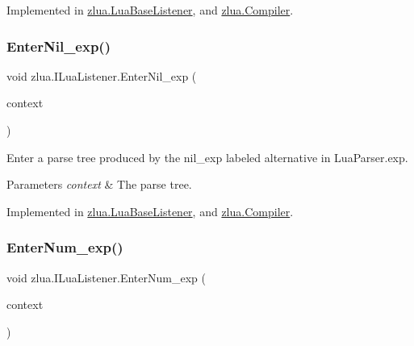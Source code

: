 Implemented in \mbox{\hyperlink{classzlua_1_1_lua_base_listener_a7e9f223eea630cb4d7deac2257225a75}{zlua.\+Lua\+Base\+Listener}}, and \mbox{\hyperlink{classzlua_1_1_compiler_a2a5054c21e462c7c373154ea435db694}{zlua.\+Compiler}}.

\mbox{\label{interfacezlua_1_1_i_lua_listener_aafcaca4386184948c08ead3b5dbba3be}} 
\subsubsection{\texorpdfstring{Enter\+Nil\+\_\+exp()}{EnterNil\_exp()}}
{\footnotesize\ttfamily void zlua.\+I\+Lua\+Listener.\+Enter\+Nil\+\_\+exp (\begin{DoxyParamCaption}\item[{\mbox{[}\+Not\+Null\mbox{]} \mbox{\hyperlink{classzlua_1_1_lua_parser_1_1_nil__exp_context}{Lua\+Parser.\+Nil\+\_\+exp\+Context}}}]{context }\end{DoxyParamCaption})}



Enter a parse tree produced by the {\ttfamily nil\+\_\+exp} labeled alternative in Lua\+Parser.\+exp. 


\begin{DoxyParams}{Parameters}
{\em context} & The parse tree.\\
\hline
\end{DoxyParams}


Implemented in \mbox{\hyperlink{classzlua_1_1_lua_base_listener_acf401fd123113e2bfdaf5c5390d81871}{zlua.\+Lua\+Base\+Listener}}, and \mbox{\hyperlink{classzlua_1_1_compiler_a311aa04e7e5d26fae07d698a436dab6d}{zlua.\+Compiler}}.

\mbox{\label{interfacezlua_1_1_i_lua_listener_aaa1853b8a53c94c2e6a7ee14bc38a698}} 
\subsubsection{\texorpdfstring{Enter\+Num\+\_\+exp()}{EnterNum\_exp()}}
{\footnotesize\ttfamily void zlua.\+I\+Lua\+Listener.\+Enter\+Num\+\_\+exp (\begin{DoxyParamCaption}\item[{\mbox{[}\+Not\+Null\mbox{]} \mbox{\hyperlink{classzlua_1_1_lua_parser_1_1_num__exp_context}{Lua\+Parser.\+Num\+\_\+exp\+Context}}}]{context }\end{DoxyParamCaption})}



